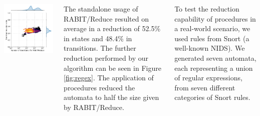 \documentclass[25pt, a1paper, portrait]{tikzposter}
\begin{document}
\begin{columns}
{\begin{tikzfigure}
\begin{minipage}{0.21\textwidth}
                \includegraphics[width=1\linewidth]{images/intersect-all-trans.pdf}
            \end{minipage}
            \label{fig:regex}
        \end{tikzfigure}

        The standalone usage of RABIT/Reduce resulted on average in a reduction of 52.5\% in states and 48.4\% in transitions. The further reduction performed by our algorithm can be seen in Figure \ref{fig:regex}. The application of procedures reduced the automata to half the size given by RABIT/Reduce.
    }

     {

        To test the reduction capability of procedures in a real-world scenario, we used rules from Snort (a well-known NIDS). We generated seven automata, each representing a union of regular expressions, from seven different categories of Snort rules.

}
\end{columns}
\end{document}
